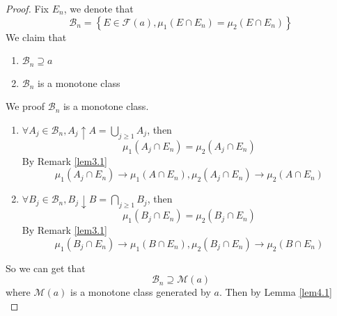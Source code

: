 \begin{proof}
	Fix ${E_n}$, we denote that
	\begin{equation}
	{\mathcal{B}_n} = \left\{ {E \in \mathcal{F}\left( a \right),{\mu _1}\left( {E \cap {E_n}} \right) = {\mu _2}\left( {E \cap {E_n}} \right)} \right\}
	\label{eq4.57}
	\end{equation}
	We claim that
	\begin{enumerate}
		\item $ {\mathcal{B}_n} \supseteq a $
		\item $ {\mathcal{B}_n} $ is a monotone class 
	\end{enumerate}
    We proof $ {\mathcal{B}_n} $ is a monotone class.
   \begin{enumerate}
   	\item $\forall {A_j} \in {\mathcal{B}_n},{A_j} \uparrow A = \bigcup\limits_{j \geqslant 1} {{A_j}} $, then 
   	\begin{equation}
   	{\mu _1}\left( {{A_j} \cap {E_n}} \right) = {\mu _2}\left( {{A_j} \cap {E_n}} \right)
   	\label{eq4.58}
   	\end{equation}
   	By Remark \ref{lem3.1}
   	\begin{equation}
   	{\mu _1}\left( {{A_j} \cap {E_n}} \right) \to {\mu _1}\left( {A \cap {E_n}} \right),{\mu _2}\left( {{A_j} \cap {E_n}} \right) \to {\mu _2}\left( {A \cap {E_n}} \right)
   	\label{eq4.59}
   	\end{equation}
   	\item $\forall {B_j} \in {\mathcal{B}_n},{B_j} \downarrow B = \bigcap\limits_{j \geqslant 1} {{B_j}} $, then 
   	\begin{equation}
   	{\mu _1}\left( {{B_j} \cap {E_n}} \right) = {\mu _2}\left( {{B_j} \cap {E_n}} \right)
   	\label{eq4.60}
   	\end{equation}
   	By Remark \ref{lem3.1}
   	\begin{equation}
   	{\mu _1}\left( {{B_j} \cap {E_n}} \right) \to {\mu _1}\left( {B \cap {E_n}} \right),{\mu _2}\left( {{B_j} \cap {E_n}} \right) \to {\mu _2}\left( {B \cap {E_n}} \right)
   	\label{eq4.61}
   	\end{equation}
   \end{enumerate} 
   So we can get that 
   \begin{equation}
    {\mathcal{B}_n} \supseteq \mathcal{M}\left( a \right)
    \label{eq4.62}
   \end{equation}
   where 
   $ \mathcal{M}\left( a \right) $ is a monotone class generated by $ a $. Then by Lemma \ref{lem4.1} 
   \begin{equation}

\end{equation}
\end{proof}
